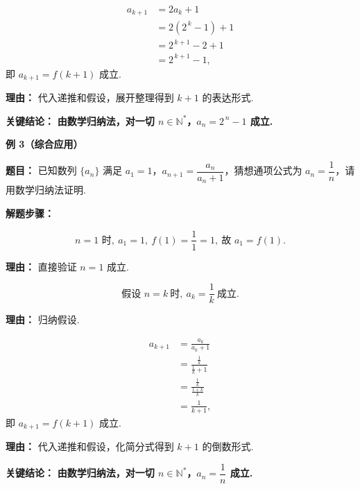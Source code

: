 \begin{examplebox}
\begin{description}[style=nextline, leftmargin=2.8em, labelsep=0.5em, itemsep=0.45em]
		\item[\textbf{第三步（递推证明）：}]
			\[
				\begin{aligned}
					a_{k+1} &= 2a_k+1 \\
					&= 2(2^{\,k}-1)+1 \\
					&= 2^{\,k+1}-2+1 \\
					&= 2^{\,k+1}-1,
			\end{aligned}
			\]
			即 $a_{k+1}=f(k+1)$ 成立.
			\par\textbf{理由：} 代入递推和假设，展开整理得到 $k+1$ 的表达形式.
	\end{description}

	\textbf{\textcolor{CExample}{关键结论：}}
	\textbf{由数学归纳法，对一切 $n\in\mathbb{N}^*$，$a_n=2^{\,n}-1$ 成立.}

	\medskip
	\textbf{\textcolor{CExample}{例 3（综合应用）}}

	\textbf{\textcolor{CExample}{题目：}}
	已知数列 $\{a_n\}$ 满足 $a_1=1$，$a_{n+1}=\dfrac{a_n}{a_n+1}$，猜想通项公式为 $a_n=\dfrac{1}{n}$，请用数学归纳法证明.

	\textbf{\textcolor{CExample}{解题步骤：}}
	\begin{description}[style=nextline, leftmargin=2.8em, labelsep=0.5em, itemsep=0.45em]
		\item[\textbf{第一步（验证起点）：}]
			\[
				n=1\text{ 时},\ a_1=1,\ f(1)=\frac{1}{1}=1,\ \text{故 }a_1=f(1).
			\]
			\par\textbf{理由：} 直接验证 $n=1$ 成立.

		\item[\textbf{第二步（归纳假设）：}]
			\[
				\text{假设 } n=k\ \text{时},\ a_k=\frac{1}{k}\ \text{成立}.
			\]
			\par\textbf{理由：} 归纳假设.

		\item[\textbf{第三步（递推证明）：}]
			\[
				\begin{aligned}
					a_{k+1} &= \frac{a_k}{a_k+1} \\
					&= \frac{\frac{1}{k}}{\frac{1}{k}+1} \\
					&= \frac{\frac{1}{k}}{\frac{1+k}{k}} \\
					&= \frac{1}{k+1},
			\end{aligned}
			\]
			即 $a_{k+1}=f(k+1)$ 成立.
			\par\textbf{理由：} 代入递推和假设，化简分式得到 $k+1$ 的倒数形式.
	\end{description}

	\textbf{\textcolor{CExample}{关键结论：}}
	\textbf{由数学归纳法，对一切 $n\in\mathbb{N}^*$，$a_n=\dfrac{1}{n}$ 成立.}
\end{examplebox}
